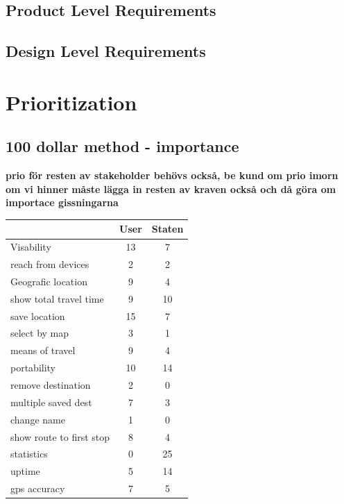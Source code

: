 \documentclass[a4paper]{article}
\begin{document}
		\subsection{Product Level Requirements}
					
		\subsection{Design Level Requirements}	
	\section{Prioritization}
		\subsection{100 dollar method -  importance}
		\textbf{prio för resten av stakeholder behövs också, be kund om prio imorn om vi hinner}
		\textbf{måste lägga in resten av kraven också och då göra om importace gissningarna}
		\begin{tabular}{|l|c|c|}
			\hline
			&User	&Staten \\
			\hline			
			Visability	&13	&7 \\
			\hline
			reach from devices	&2	&2 \\
			\hline
			Geografic location	&9	&4 \\
			\hline
			show total travel time	&9	&10 \\
			\hline
			save location	&15	&7 \\
			\hline
			select by map	&3	&1 \\
			\hline
			means of travel	&9	&4 \\
			\hline
			portability	&10	&14 \\
			\hline
			remove destination	&2	&0 \\
			\hline
			multiple saved dest	&7	&3 \\
			\hline
			change name	&1	&0 \\
			\hline
			show route to first stop	&8	&4 \\
			\hline
			statistics	&0	&25 \\
			\hline
			uptime	&5	&14 \\
			\hline
			gps accuracy	&7	&5 \\
			\hline			
			
		\end{tabular}
\end{document}
